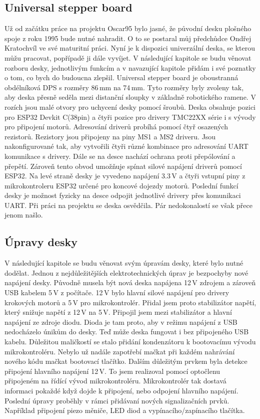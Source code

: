 \subsection{Universal stepper board}
Už od začátku práce na projektu Oscar95 bylo jasné, že původní desku plošného spoje z roku 1995 bude nutné nahradit. O to se postaral můj před\-chůd\-ce Ondřej Kratochvíl ve své maturitní práci. Nyní je k dispozici univerzální deska, se kterou můžu pracovat, popřípadě ji dále vyvíjet. 
V následující kapitole se budu věnovat rozboru desky, jednotlivým funkcím a v navazující kapitole přidám i své poznatky o tom, co bych do budoucna zlepšil. Universal stepper board je oboustranná 
obdélníková DPS s rozměry 86\,mm na 74\,mm. Tyto rozměry byly zvoleny tak, aby deska 
přesně seděla mezi distanční sloupky v základně robotického ramene. V rozích jsou malé 
otvory pro uchycení desky pomocí šroubů. Deska obsahuje pozici pro ESP32 Devkit C(38pin) 
a čtyři pozice pro drivery TMC22XX série i s vývody pro připojení motorů. Adresování driverů 
probíhá pomocí čtyř osazených rezistorů. Rezistory jsou připojeny na piny MS1 a MS2 driveru. 
Jsou nakonfigurované tak, aby vytvořili čtyři různé kombinace pro adresování UART 
komunikace s drivery. Dále se na desce nachází ochrana proti přepólování a přepětí. Zároveň 
tento obvod umožňuje spínat silové napájení driverů pomocí ESP32. Na levé straně desky je 
vyvedeno napájení 3.3\,V a čtyři vstupní piny z mikrokontroleru ESP32 určené pro koncové 
dojezdy motorů. Poslední funkcí desky je možnost fyzicky na desce odpojit jednotlivé drivery 
přes komunikaci UART. Při práci na projektu se deska osvědčila. Pár nedokonalostí se však 
přece jenom našlo. \cite{Universalstepperboard}
\subsection{Úpravy desky}
V následující kapitole se budu věnovat svým úpravám desky, které bylo nutné dodělat. Jednou z nejdůležitějších elektrotechnických úprav je bezpochyby nové napájení desky. Původně musela být nová deska napájena 12\,V zdrojem a zároveň USB kabelem 5\,V z počítače. 12\,V bylo hlavní silové napájení pro drivery krokových motorů a 5\,V pro mikrokontrolér. Přidal jsem proto stabilizátor napětí, který snižuje napětí z 12\,V na 5\,V. Připojil jsem mezi stabilizátor a hlavní napájení ze zdroje diodu. Dioda je tam proto, aby v režimu napájení z USB nedocházelo únikům do desky. Teď může deska fungovat i bez připojeného USB kabelu. Důležitou maličkostí se stalo přidání kondenzátoru k bootovacímu vývodu mikrokontroléru. Nebylo už nadále zapotřebí mačkat při každém nahrávání nového kódu mačkat bootovací tlačítko. Dalším důležitým prvkem byla detekce připojení hlavního napájení 12\,V. To jsem realizoval pomocí optočlenu při\-po\-je\-ném na řídící vývod mikrokontroléru. Mikrokontrolér tak dostavá informaci pokaždé když dojde k připojení, nebo odpojení hlavního napájení. Poslední úpravy proběhly v rámci přidávaní nových signalizačních prvků. Například připojení piezo měniče, LED diod a  vypínacího/zapínacího tlačítka.


